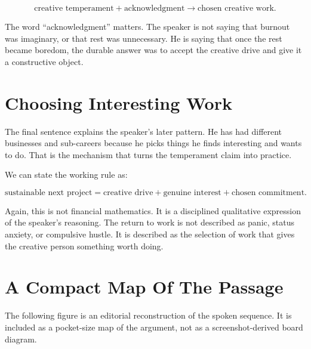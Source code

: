 \begin{equation}
\text{creative temperament}
+
\text{acknowledgment}
\longrightarrow
\text{chosen creative work}.
\end{equation}

The word ``acknowledgment'' matters. The speaker is not saying that burnout was imaginary, or that rest was unnecessary. He is saying that once the rest became boredom, the durable answer was to accept the creative drive and give it a constructive object.

\section{Choosing Interesting Work}

The final sentence explains the speaker's later pattern. He has had different businesses and sub-careers because he picks things he finds interesting and wants to do. That is the mechanism that turns the temperament claim into practice.

We can state the working rule as:

\begin{equation}
\text{sustainable next project}
=
\text{creative drive}
+
\text{genuine interest}
+
\text{chosen commitment}.
\end{equation}

Again, this is not financial mathematics. It is a disciplined qualitative expression of the speaker's reasoning. The return to work is not described as panic, status anxiety, or compulsive hustle. It is described as the selection of work that gives the creative person something worth doing.

\section{A Compact Map Of The Passage}

The following figure is an editorial reconstruction of the spoken sequence. It is included as a pocket-size map of the argument, not as a screenshot-derived board diagram.

